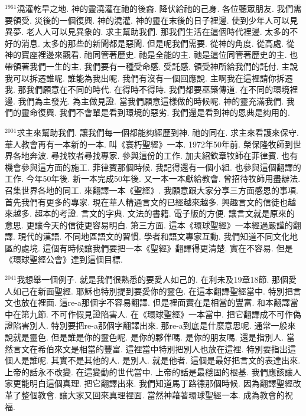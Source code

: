 \documentclass{book}
\begin{document}
$^{1961}$澆灌乾旱之地.
神的靈澆灌在祂的後裔.
降伏給祂的己身.
各位聽眾朋友.
我們需要領受.
災後的一個復興.
神的澆灌.
神的靈在末後的日子裡邊.
使到少年人可以見異夢.
老人人可以見異象的.
求主幫助我們.
那我們生活在這個時代裡邊.
太多的不好的消息.
太多的那些的新聞都是惡聞.
但是呢我們需要.
從神的角度.
從高處.
從神的寶座裡邊來觀看.
祂同管著歷史.
祂是全能的主.
祂是這位同管著歷史的主.
也帶領著我們一生的主.
我們要有一種受命感.
受託感.
領受神所給我們的託付.
主說我可以拆遷誰呢.
誰能為我出呢.
我們有沒有一個回應說.
主啊我在這裡請你拆遷我.
那我們願意在不同的時代.
在得時不得時.
我們都要巫藥傳道.
在不同的環境裡邊.
我們為主發光.
為主做見證.
當我們願意這樣做的時候呢.
神的靈充滿我們.
我們的靈命復興.
我們不會單是看到環境的惡劣.
我們還是看到神的恩典是夠用的.

$^{2001}$求主來幫助我們.
讓我們每一個都能夠經歷到神.
祂的同在.
求主來看護來保守.
華人教會再有一本新的一本.
叫《寰朽聖經》一本.
1972年50年前.
榮保隆牧師到世界各地奔波.
尋找牧者尋找專家.
參與這份的工作.
加夫紹欽章牧師在菲律賓.
也有機會參與這方面的施工.
菲律賓那個時候.
我記得還有一個小組.
也參與這個翻譯的工作.
今年50年後.
新一本完成50年後.
又一本一本獻給教會.
曾招待牧師用盡辦法.
召集世界各地的同工.
來翻譯一本《聖經》.
我願意跟大家分享三方面感恩的事項.
首先我們有更多的專家.
現在華人精通言文的已經越來越多.
興趣言文的信徒也越來越多.
超本的考證.
言文的字典.
文法的書籍.
電子版的方便.
讓言文就是原來的意思.
更讓今天的信徒更容易明白.
第三方面.
這本《環球聖經》一本經過嚴謹的翻譯.
現代的漢語.
不同地區語文的習慣.
學者和語文專家互動.
我們知道不同文化地區的處境.
這個有時候讓我們要把一本《聖經》翻譯得更清楚.
實在不容易.
但是《環球聖經公會》達到這個目標.

$^{2041}$我想舉一個例子.
就是我們很熟悉的要愛人如己的.
在利未及19章18節.
那個愛人如己在新面聖經.
耶穌也特別提到要愛你的靈色.
在這本翻譯聖經當中.
特別把言文也放在裡面.
這re-a那個字不容易翻譯.
但是裡面實在是相當的豐富.
和本翻譯當中在第九節.
不可作假見證陷害人.
在《環球聖經》一本當中.
把它翻譯成不可作偽證陷害別人.
特別要把re-a那個字翻譯出來.
那re-a到底是什麼意思呢.
通常一般來說就是靈色.
但是誰是你的靈色呢.
是你的夥伴嗎.
是你的朋友嗎.
還是指別人.
當然言文在希伯來文是相當的豐富.
這裡當中特別把別人也放在這裡.
特別要指出這個人是誰呢.
其實不是其他的人.
是別人.
就是他者.
這個是最好把言文的表達出來.
上帝的話永不改變.
在這變動的世代當中.
上帝的話是最穩固的根基.
我們應該讓人家更能明白這個真理.
把它翻譯出來.
我們知道馬丁路德那個時候.
因為翻譯聖經改革了整個教會.
讓大家又回來真理裡面.
當然神藉著環球聖經一本.
成為教會的祝福.
\newpage
\end{document}
